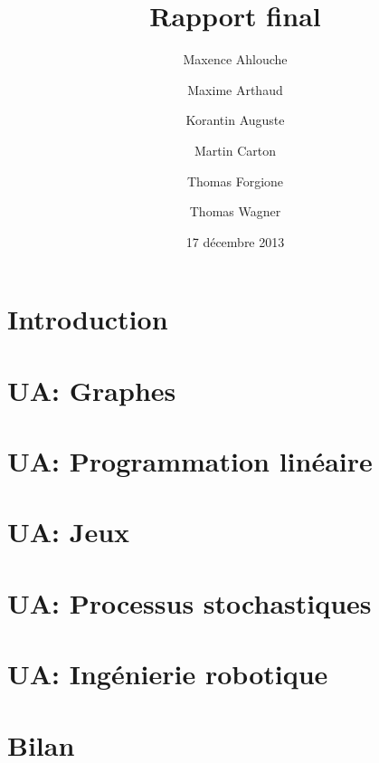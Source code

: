 \documentclass{scrartcl}
\title{Rapport final}
\author{Maxence Ahlouche \and Maxime Arthaud \and Korantin Auguste
  \and Martin Carton \and Thomas Forgione \and Thomas Wagner}
\date{17 décembre 2013}
\begin{document}
  
  \newpage
  \tableofcontents

  \newpage
  \section{Introduction}
    

  \newpage
  \section{UA: Graphes}
    

  \newpage
  \section{UA: Programmation linéaire}
    

  \newpage
  \section{UA: Jeux}
    

  \newpage
  \section{UA: Processus stochastiques}
    

  \newpage
  \section{UA: Ingénierie robotique}
    

  \newpage
  \section{Bilan}
    
\end{document}
